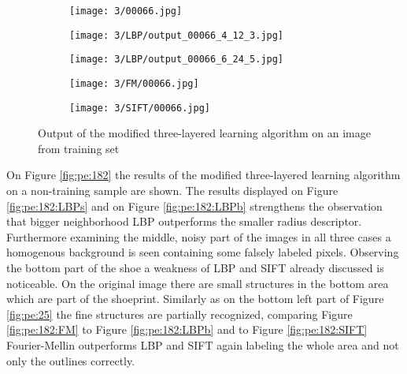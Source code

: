 \documentclass[draft,final]{vutinfth} %
\begin{document}
\begin{figure}[h]
  \centering
  \begin{subfigure}[t]{0.19\columnwidth}
    \centering
    \texttt{[image: 3/00066.jpg]}
    \label{fig:pe:66:orig}
  \end{subfigure}
  \begin{subfigure}[t]{0.19\columnwidth}
    \centering
    \texttt{[image: 3/LBP/output\_00066\_4\_12\_3.jpg]}
    \label{fig:pe:66:LBPs}
  \end{subfigure}
  \begin{subfigure}[t]{0.19\columnwidth}
    \centering
    \texttt{[image: 3/LBP/output\_00066\_6\_24\_5.jpg]}
    \label{fig:pe:66:LBPb}
  \end{subfigure}
  \begin{subfigure}[t]{0.19\columnwidth}
    \centering
    \texttt{[image: 3/FM/00066.jpg]}
    \label{fig:pe:66:FM}
  \end{subfigure}
  \begin{subfigure}[t]{0.19\columnwidth}
    \centering
    \texttt{[image: 3/SIFT/00066.jpg]}
    \label{fig:pe:66:SIFT}
  \end{subfigure}
  \caption{Output of the modified three-layered learning algorithm on an image from training set}
  \label{fig:pe:66}
\end{figure}

\par
On Figure \ref{fig:pe:182} the results of the modified three-layered learning algorithm on a non-training sample are shown.
The results displayed on Figure \ref{fig:pe:182:LBPs} and on Figure \ref{fig:pe:182:LBPb} strengthens the observation that bigger neighborhood LBP outperforms the smaller radius descriptor.
Furthermore examining the middle, noisy part of the images in all three cases a homogenous background is seen containing some falsely labeled pixels.
Observing the bottom part of the shoe a weakness of LBP and SIFT already discussed is noticeable.
On the original image there are small structures in the bottom area which are part of the shoeprint.
Similarly as on the bottom left part of Figure \ref{fig:pe:25} the fine structures are partially recognized, comparing Figure \ref{fig:pe:182:FM} to Figure \ref{fig:pe:182:LBPb} and to Figure \ref{fig:pe:182:SIFT} Fourier-Mellin outperforms LBP and SIFT again labeling the whole area and not only the outlines correctly.
\end{document}
